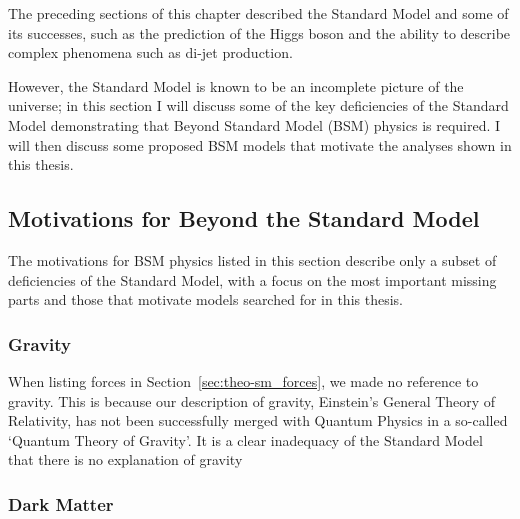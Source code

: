 The preceding sections of this chapter described the Standard Model
and some of its successes,
such as the prediction of the Higgs boson and the ability to describe complex phenomena such as di-jet production.

However, the Standard Model is known to be an incomplete picture of the universe;
in this section I will discuss some of the key deficiencies of the Standard Model demonstrating
that Beyond Standard Model (BSM) physics is required.
I will then discuss some proposed BSM models that motivate the analyses shown in this thesis.

\subsection{Motivations for Beyond the Standard Model}

The motivations for BSM physics listed in this section
describe only a subset of deficiencies of the Standard Model,
with a focus on the most important missing parts and
those that motivate models searched for in this thesis.

\subsubsection{Gravity}

When listing forces in Section~\ref{sec:theo-sm_forces}, we made no reference to gravity.
This is because our description of gravity, Einstein's General Theory of Relativity,
has not been successfully merged with Quantum Physics in a so-called `Quantum Theory of Gravity'.
It is a clear inadequacy of the Standard Model that there is no explanation of gravity

\subsubsection{Dark Matter}
\label{sec:theo_bsm_dm}


